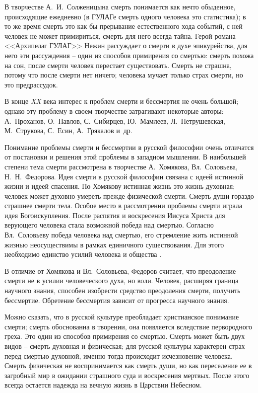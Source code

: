 \documentclass[pscyr,chapters]{hedwork}
\begin{document}
  В творчестве А.~И.~Солженицына смерть понимается как нечто обыденное,
  происходящие ежедневно (в ГУЛАГе смерть одного человека это статистика); в то
  же время смерть это как бы прерывание естественного хода событий, с ней
  человек не может примириться, смерть для него всегда тайна. Герой романа
  <<Архипелаг ГУЛАГ>> Нежин рассуждает о смерти в духе эпикурейства, для него
  эти рассуждения – один из способов примирения со смертью: смерть похожа на
  сон, после смерти человек перестает существовать. Смерть не страшна, потому
  что после смерти нет ничего; человека мучает только страх смерти, но это
  предрассудок.

  В конце \emph{XX} века интерес к проблем смерти и бессмертия не очень большой;
  однако эту проблему в своем творчестве затрагивают некоторые авторы:
  А.~Проханов, О.~Павлов, С.~Сибирцев, Ю.~Мамлеев, Л.~Петрушевская, М.~Струкова,
  С.~Есин, А.~Грякалов и~др.

  Понимание проблемы смерти и бессмертии в русской философии очень отличатся от
  постановки и решения этой проблемы в западном мышлении. В наибольшей степени
  тема смерти рассмотрена в творчестве А.~Хомякова, Вл.~Соловьева,
  Н.~Н.~Федорова. Идея смерти в русской философии связана с идеей истинной жизни
  и идеей спасения. По Хомякову истинная жизнь это жизнь духовная; человек может
  духовно умереть прежде физической смерти. Смерть души гораздо страшнее смерти
  тела. Особое место в рассмотрении проблемы смерти играла идея Богоискупления.
  После распятия и воскресения Иисуса Христа для верующего человека стала
  возможной победа над смертью. Согласно Вл.~Соловьеву победа человека над
  смертью, его стремление жить истинной жизнью неосуществимы в рамках единичного
  существования. Для этого необходимо единство усилий человека и общества
  \cite{4}.

  В отличие от Хомякова и Вл.~Соловьева, Федоров считает, что преодоление смерти
  не в усилии человеческого духа, но воли. Человек, расширяя граница научного
  знания, способен изобрести средство преодоления смерти, получить бессмертие.
  Обретение бессмертия зависит от прогресса научного знания.

  Можно сказать, что в русской культуре преобладает христианское понимание
  смерти; смерть обоснованна в творении, она появляется вследствие первородного
  греха. Это один из способов примирения со смертью. Смерть может быть двух
  видов – смерть духовная и физическая; для русской культуры характерен страх
  перед смертью духовной, именно тогда происходит исчезновение человека. Смерть
  физическая не воспринимается как смерть души, но как переселение ее в
  загробный мир в ожидании страшного суда и воскресения мертвых. После этого
  всегда остается надежда на вечную жизнь в Царствии Небесном.
\end{document}
